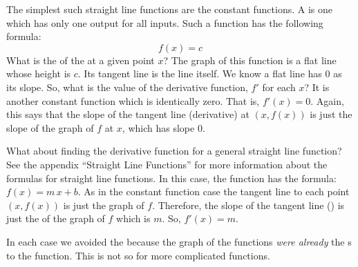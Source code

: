 The simplest such straight line functions are the constant functions.
A  is one which has 
only one output for all inputs. Such a function has the following formula:
$$
f(x) = c
$$
What is the  of the  at a given point $x$? The graph
of this function is a flat line whose height is $c$. Its tangent line 
is the line itself. We know a flat line has $0$ as its slope. 
So, what is the value of the derivative function, $f'$ for each $x$? It is 
another constant function which is identically zero. That is,
$f'(x) = 0$. Again, this says that the slope of the tangent line (derivative)
at $(x,f(x))$ is just the slope of the graph of $f$ at $x$, which has slope $0$.

What about finding the derivative function for a general 
straight line function?
See the appendix ``Straight Line Functions'' for more information 
about the formulas for straight line 
functions. In this case, the function has the formula: $f(x) = m\,x + b$.
As in the constant function case the tangent line
to each point $(x,f(x))$ is just the graph of 
$f$. Therefore, the slope of the tangent line () is just the  
of the graph of $f$ which is $m$. So, $f'(x) = m$.

In each case we avoided the  because the graph of the 
functions {\it were already\/} the s to the function. 
This is not so for more complicated functions.

